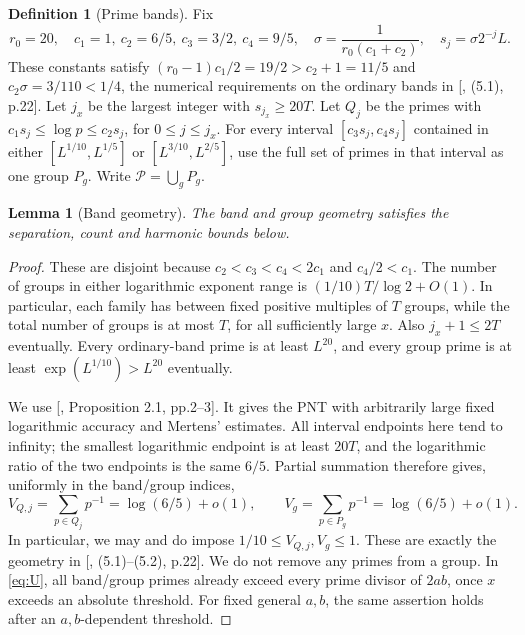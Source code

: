 \documentclass[11pt]{article}
\newtheorem{lemma}[theorem]{Lemma}
\theoremstyle{definition}
\newtheorem{definition}[theorem]{Definition}
\theoremstyle{definition}
\begin{document}
\begin{definition}[Prime bands]\label{def:bands}
Fix
\begin{equation*}
r_0=20,\quad c_1=1,\ c_2=6/5,\ c_3=3/2,\ c_4=9/5,\quad
 \sigma=\frac1{r_0(c_1+c_2)},\quad s_j=\sigma2^{-j}L.
\end{equation*}
These constants satisfy \((r_0-1)c_1/2=19/2>c_2+1=11/5\) and \(c_2\sigma=3/110<1/4\), the numerical requirements on the ordinary bands in [, (5.1), p.22].
Let \(j_x\) be the largest integer with \(s_{j_x}\ge20T\). Let \(Q_j\) be the primes with \(c_1s_j\le\log p\le c_2s_j\), for \(0\le j\le j_x\). For every interval \([c_3s_j,c_4s_j]\) contained in either \([L^{1/10},L^{1/5}]\) or \([L^{3/10},L^{2/5}]\), use the full set of primes in that interval as one group \(P_g\). Write \(\mathcal P=\bigcup_gP_g\).

\end{definition}
\begin{lemma}[Band geometry]\label{lem:bands}
The band and group geometry satisfies the separation, count and harmonic bounds below.
\end{lemma}
\begin{proof}
These are disjoint because \(c_2<c_3<c_4<2c_1\) and \(c_4/2<c_1\). The number of groups in either logarithmic exponent range is
\((1/10)T/\log2+O(1)\). In particular, each family has between fixed positive multiples of \(T\) groups, while the total number of groups is at most \(T\), for all sufficiently large \(x\). Also \(j_x+1\le2T\) eventually. Every ordinary-band prime is at least \(L^{20}\), and every group prime is at least \(\exp(L^{1/10})>L^{20}\) eventually.

We use [, Proposition 2.1, pp.2--3]. It gives the PNT with arbitrarily large fixed logarithmic accuracy and Mertens' estimates. All interval endpoints here tend to infinity; the smallest logarithmic endpoint is at least \(20T\), and the logarithmic ratio of the two endpoints is the same \(6/5\). Partial summation therefore gives, uniformly in the band/group indices,
\begin{equation}
V_{Q,j}=\sum_{p\in Q_j}p^{-1}=\log(6/5)+o(1),\qquad
 V_g=\sum_{p\in P_g}p^{-1}=\log(6/5)+o(1).                \tag{1.1}\label{eq:1-1}
\end{equation}
In particular, we may and do impose \(1/10\le V_{Q,j},V_g\le1\). These are exactly the geometry in [, (5.1)--(5.2), p.22]. We do not remove any primes from a group. In \eqref{eq:U}, all band/group primes already exceed every prime divisor of \(2ab\), once \(x\) exceeds an absolute threshold. For fixed general \(a,b\), the same assertion holds after an \(a,b\)-dependent threshold.

\end{proof}
\end{document}

